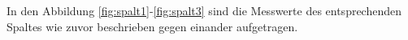 In den Abbildung \ref{fig:spalt1}-\ref{fig:spalt3} sind
die Messwerte des entsprechenden Spaltes wie zuvor beschrieben
gegen einander aufgetragen.
%
